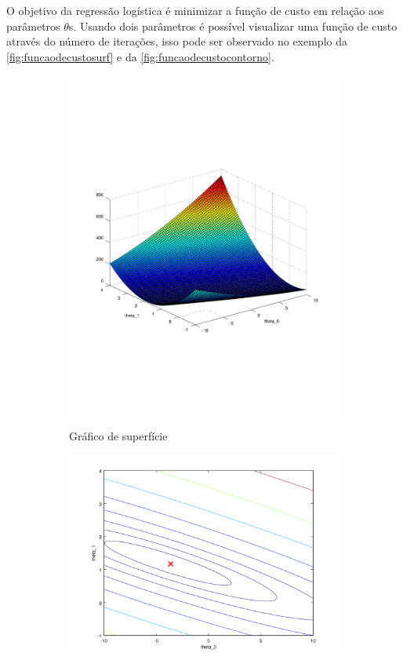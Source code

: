 O objetivo da regressão logística é minimizar a função de custo em relação aos parâmetros $\theta$s. Usando dois parâmetros é possível visualizar uma função de custo através do número de iterações, isso pode ser observado no exemplo da \autoref{fig:funcaodecustosurf} e da \autoref{fig:funcaodecustocontorno}. 


\begin{figure}
  \caption{Função de custo - $J(\theta_0, \theta_1)$}
  \begin{subfigure}[htb]{0.5\textwidth} 
    \includegraphics[width=\textwidth]{img/funcaodecustosurf} 
    \caption{Gráfico de superfície} \label{fig:funcaodecustosurf}
  \end{subfigure} 
  \begin{subfigure}[htb]{0.5\textwidth}
    \includegraphics[width=\textwidth]{img/funcaodecustocontorno} 

\end{subfigure}
\end{figure}
